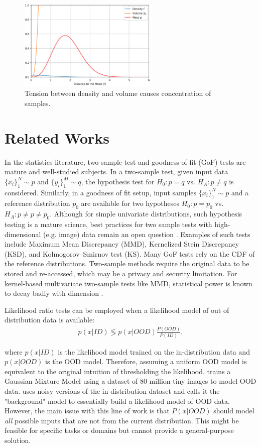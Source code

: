 \begin{figure}[h]
    \centering
    \includegraphics[width=0.6\textwidth]{figures/ch4/gaussian.png}
    \caption{Tension between density and volume causes concentration of samples.}
    \label{fig:4-4}
\end{figure}


\section{Related Works}
In the statistics literature, two-sample test and goodness-of-fit (GoF) tests are mature and well-studied subjects. In a two-sample test, given input data $\{x_i\}_1^N \sim p$ and $\{y_i\}_1^M \sim q$, the hypothesis test for $H_0: p=q$ vs. $H_A: p\neq q$ is considered. Similarly, in a goodness of fit setup, input samples  $\{x_i\}_1^N \sim p$ and a reference distribution $p_0$ are available for two hypotheses $H_0: p=p_0$ vs. $H_A: p\neq p\neq p_0$. Although for simple univariate distributions, such hypothesis testing is a mature science, best practices for two sample tests with high-dimensional (e.g. image) data remain an open question \cite{rabanser2019failing}. Examples of such tests include Maximum Mean Discrepancy (MMD), Kernelized Stein Discrepancy (KSD), and Kolmogorov–Smirnov test (KS). Many GoF tests rely on the CDF of the reference distributions. Two-sample methods require the original data to be stored and re-accessed, which may be a privacy and security limitation. For kernel-based multivariate two-sample tests like MMD, statistical power is known to decay badly with dimension \cite{ramdas2015decreasing}.

Likelihood ratio tests can be employed when a likelihood model of out of distribution data is available:
\begin{align*}
    p(x|ID) \lessgtr p(x|OOD) \frac{P(OOD)}{P(ID)},
\end{align*}

where $p(x|ID)$ is the likelihood model trained on the in-distribution data and $p(x|OOD)$ is the OOD model. Therefore, assuming a uniform OOD model is equivalent to the original intuition of thresholding the likelihood. \cite{meinke2019towards} trains a Gaussian Mixture Model using a dataset of 80 million tiny images to model OOD data. \cite{ren2019likelihood} uses noisy versions of the in-distribution dataset and calls it the "background" model to essentially build a likelihood model of OOD data. However, the main issue with this line of work is that $P(x|OOD)$ should model \textit{all} possible inputs that are not from the current distribution. This might be feasible for specific tasks or domains but cannot provide a general-purpose solution.

